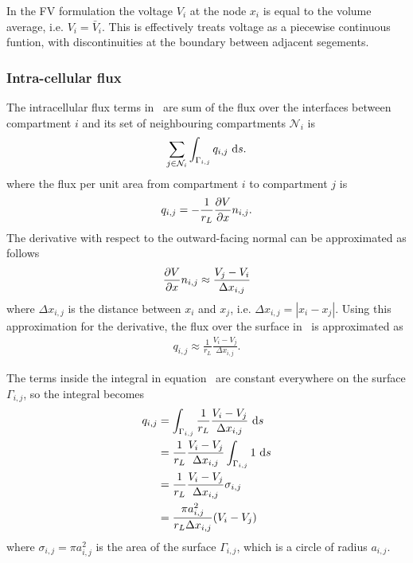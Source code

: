 In the FV formulation the voltage $V_i$ at the node $x_i$ is equal to the volume average, i.e. $V_i=\bar{V}_i$.
This is effectively treats voltage as a piecewise continuous funtion, with discontinuities at the boundary between adjacent segements.

\subsubsection{Intra-cellular flux}
The intracellular flux terms in~ are sum of the flux over the interfaces between compartment $i$ and its set of neighbouring compartments $\mathcal{N}_i$ is
\begin{equation}
    \sum_{j\in\mathcal{N}_i} { \int_{\Gamma_{i,j}} { q_{i,j} ~\text{d}{s} } }.
\end{equation}
where the flux per unit area from compartment $i$ to compartment $j$ is
\begin{align}
    q_{i,j} = - \frac{1}{r_L}\frac{\partial{V}}{\partial{x}} n_{i,j}.
    \label{eq:q_ij}
\end{align}
The derivative with respect to the outward-facing normal can be approximated as follows
\begin{equation*}
    \frac{\partial{V}}{\partial{x}} n_{i,j} \approx \frac{V_j - V_i}{\Delta x_{i,j}}
\end{equation*}
where $\Delta x_{i,j}$ is the distance between $x_i$ and $x_j$, i.e. $\Delta x_{i,j}=|x_i-x_j|$.
Using this approximation for the derivative, the flux over the surface in~ is approximated as
\begin{align}
    q_{i,j} \approx \frac{1}{r_L}\frac{V_i - V_j}{\Delta x_{i,j}}.
    \label{eq:q_ij_intermediate}
\end{align}

The terms inside the integral in equation~ are constant everywhere on the surface $\Gamma_{i,j}$, so the integral becomes
\begin{align}
  q_{i,j} &= \int_{\Gamma_{i,j}}  \frac{1}{r_L}\frac{V_i-V_j}{\Delta x_{i,j}} ~\text{d}{s} \nonumber \\
          &= \frac{1}{r_L}\frac{V_i-V_j}{\Delta x_{i,j}} \int_{\Gamma_{i,j}} 1 ~\text{d}{s} \nonumber \\
          &= \frac{1}{r_L}\frac{V_i-V_j}{\Delta x_{i,j}} \sigma_{i,j} \nonumber \\
          &= \frac{\pi a_{i,j}^2}{r_L \Delta x_{i,j}} (V_i-V_j)
          \label{eq:q_ij}
\end{align}
where $\sigma_{i,j}=\pi a_{i,j}^2$ is the area of the surface $\Gamma_{i,j}$, which is a circle of radius $a_{i,j}$.


